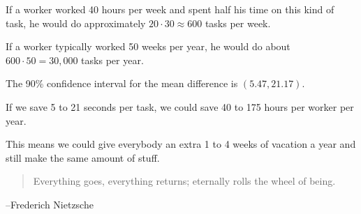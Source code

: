 \documentclass[letterpaper]{exam}
\begin{document}
\begin{description}
        If a worker worked 40 hours per week and spent half his time on this
        kind of task, he would do approximately $20 \cdot 30 \approx 600$ tasks
        per week. 
        
        If a worker typically worked 50 weeks per year, he would do about $600
        \cdot 50 = 30,000$ tasks per year.

        The 90\% confidence interval for the mean difference is $(5.47, 21.17)$.

        If we save 5 to 21 seconds per task, we could save 40 to 175 hours per
        worker per year. 

        This means we could give everybody an extra 1 to 4 weeks of vacation a
        year and still make the same amount of stuff.

  \end{description}

  \else
    \vspace{12 cm}
    \begin{quote}
      \begin{em}
        Everything goes, everything returns; eternally rolls the wheel of
        being.
      \end{em}
    \end{quote}
    \hspace{1 cm}--Frederich Nietzsche
  \fi
\end{document}
